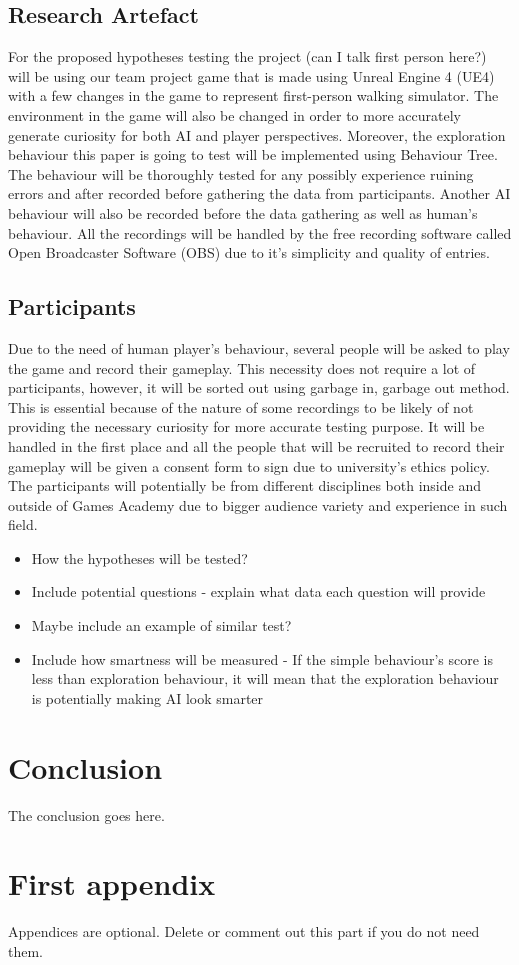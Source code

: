 \documentclass[journal]{IEEEtran}
\begin{document}
\subsection{Research Artefact}
For the proposed hypotheses testing the project (can I talk first person here?) will be using our team project game that is made using Unreal Engine 4 (UE4) with a few changes in the game to represent first-person walking simulator. The environment in the game will also be changed in order to more accurately generate curiosity for both AI and player perspectives. Moreover, the exploration behaviour this paper is going to test will be implemented using Behaviour Tree. The behaviour will be thoroughly tested for any possibly experience ruining errors and after recorded before gathering the data from participants. Another AI behaviour will also be recorded before the data gathering as well as human's behaviour. All the recordings will be handled by the free recording software called Open Broadcaster Software (OBS) due to it's simplicity and quality of entries.

\subsection{Participants}
Due to the need of human player's behaviour, several people will be asked to play the game and record their gameplay. This necessity does not require a lot of participants, however, it will be sorted out using garbage in, garbage out method. This is essential because of the nature of some recordings to be likely of not providing the necessary curiosity for more accurate testing purpose. It will be handled in the first place and all the people that will be recruited to record their gameplay will be given a consent form to sign due to university's ethics policy. The participants will potentially be from different disciplines both inside and outside of Games Academy due to bigger audience variety and experience in such field.

\begin{itemize}
	\item How the hypotheses will be tested?
	\item Include potential questions - explain what data each question will provide
	\item Maybe include an example of similar test?
	\item Include how smartness will be measured - If the simple behaviour's score is less than exploration behaviour, it will mean that the exploration behaviour is potentially making AI look smarter
\end{itemize}

\section{Conclusion}
The conclusion goes here.






\appendices
\section{First appendix}
Appendices are optional. Delete or comment out this part if you do not need them.

\end{document}
